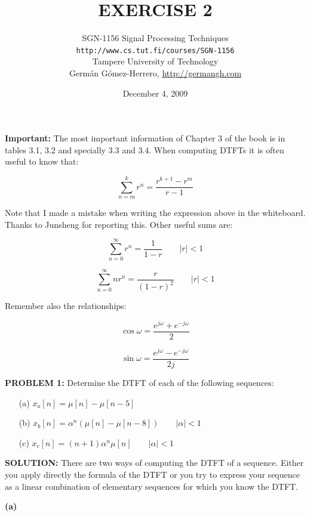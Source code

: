 \documentclass[a4paper,11pt,oneside]{article}
\title{\large{\textbf{EXERCISE 2}}}
\author{SGN-1156 Signal Processing Techniques\\
\texttt{http://www.cs.tut.fi/courses/SGN-1156}\\
Tampere University of Technology\\
Germ\'an G\'omez-Herrero, \url{http://germangh.com}}
\date{December 4, 2009}
\begin{document}
\maketitle


\textbf{Important:} The most important information of Chapter 3 of the book is in tables 3.1, 3.2 and specially 3.3 and 3.4. When computing DTFTs it is often useful to know that:

\[
\sum_{n=m}^{k}r^{n}=\frac{r^{k+1}-r^m}{r-1}
\]

Note that I made a mistake when writing the expression above in the whiteboard. Thanks to Junsheng for reporting this. Other useful sums are:

\[
\sum_{n=0}^{\infty} r^{n}=\frac{1}{1-r} \qquad |r|<1
\] 

\[
\sum_{n=0}^{\infty} nr^{n}=\frac{r}{(1-r)^2} \qquad |r|<1
\]

Remember also the relationships:

\[
\cos \omega = \frac{e^{j\omega}+e^{-j\omega}}{2}
\]

\[
\sin \omega = \frac{e^{j\omega}-e^{-j\omega}}{2j}
\]






\textbf{PROBLEM 1:} Determine the DTFT of each of the following sequences:

\begin{itemize}
\item[(a)] $x_a[n] = \mu[n]-\mu[n-5]$
\item[(b)] $x_b[n] = \alpha^n\left(\mu[n]-\mu[n-8]\right) \qquad |\alpha|< 1$
\item[(c)] $x_c[n] = (n+1)\alpha^n\mu[n] \qquad |\alpha|<1$
\end{itemize}  



\vspace{1cm}



\textbf{SOLUTION:}
There are two ways of computing the DTFT of a sequence. Either you apply directly the formula of the DTFT or you try to express your sequence as a linear combination of elementary sequences for which you know the DTFT. 

\vspace{.5cm}

\textbf{(a)}
\end{document}
